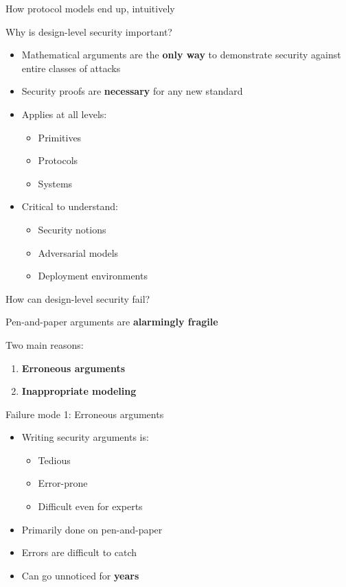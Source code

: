 \documentclass[aspectratio=169, lualatex, handout]{beamer}
\begin{document}
\begin{frame}{How protocol models end up, intuitively}
\end{frame}

\begin{frame}{Why is design-level security important?}
	\begin{itemize}
		\item Mathematical arguments are the \textbf{only way} to demonstrate security against entire classes of attacks
		\item Security proofs are \textbf{necessary} for any new standard
		\item Applies at all levels:
		      \begin{itemize}
			      \item Primitives
			      \item Protocols
			      \item Systems
		      \end{itemize}
		\item Critical to understand:
		      \begin{itemize}
			      \item Security notions
			      \item Adversarial models
			      \item Deployment environments
		      \end{itemize}
	\end{itemize}
\end{frame}

\begin{frame}{How can design-level security fail?}
	\begin{center}
		\Large
		Pen-and-paper arguments are \textbf{alarmingly fragile}
	\end{center}
	\vspace{1em}
	Two main reasons:
	\begin{enumerate}
		\item \textbf{Erroneous arguments}
		\item \textbf{Inappropriate modeling}
	\end{enumerate}
\end{frame}

\begin{frame}{Failure mode 1: Erroneous arguments}
	\begin{itemize}
		\item Writing security arguments is:
		      \begin{itemize}
			      \item Tedious
			      \item Error-prone
			      \item Difficult even for experts
		      \end{itemize}
		\item Primarily done on pen-and-paper
		\item Errors are difficult to catch
		\item Can go unnoticed for \textbf{years}
	\end{itemize}
\end{frame}
\end{document}
